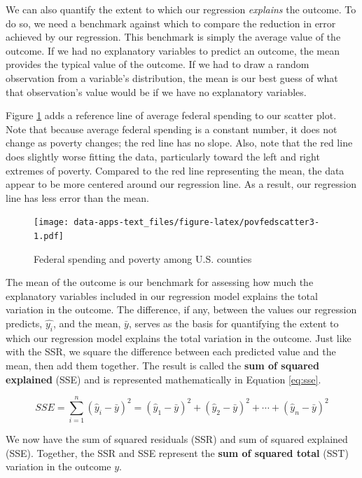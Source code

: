 \documentclass[
]{book}
\begin{document}
We can also quantify the extent to which our regression \emph{explains} the outcome. To do so, we need a benchmark against which to compare the reduction in error achieved by our regression. This benchmark is simply the average value of the outcome. If we had no explanatory variables to predict an outcome, the mean provides the typical value of the outcome. If we had to draw a random observation from a variable's distribution, the mean is our best guess of what that observation's value would be if we have no explanatory variables.

Figure \ref{fig:povfedscatter3} adds a reference line of average federal spending to our scatter plot. Note that because average federal spending is a constant number, it does not change as poverty changes; the red line has no slope. Also, note that the red line does slightly worse fitting the data, particularly toward the left and right extremes of poverty. Compared to the red line representing the mean, the data appear to be more centered around our regression line. As a result, our regression line has less error than the mean.

\begin{figure}
\centering
\texttt{[image: data-apps-text\_files/figure-latex/povfedscatter3-1.pdf]}
\caption{\label{fig:povfedscatter3}Federal spending and poverty among U.S. counties}
\end{figure}

The mean of the outcome is our benchmark for assessing how much the explanatory variables included in our regression model explains the total variation in the outcome. The difference, if any, between the values our regression predicts, \(\hat{y_i}\), and the mean, \(\bar{y}\), serves as the basis for quantifying the extent to which our regression model explains the total variation in the outcome. Just like with the SSR, we square the difference between each predicted value and the mean, then add them together. The result is called the \textbf{sum of squared explained} (SSE) and is represented mathematically in Equation \eqref{eq:sse}.

\begin{equation}
SSE=\sum _{i=1}^{n}(\hat{y}_{i}-\bar{y})^2= (\hat{y}_{1}-\bar{y})^2+(\hat{y}_{2}-\bar{y})^2+\cdots +(\hat{y}_{n}-\bar{y})^2
\label{eq:sse}
\end{equation}

We now have the sum of squared residuals (SSR) and sum of squared explained (SSE). Together, the SSR and SSE represent the \textbf{sum of squared total} (SST) variation in the outcome \(y\).
\end{document}
